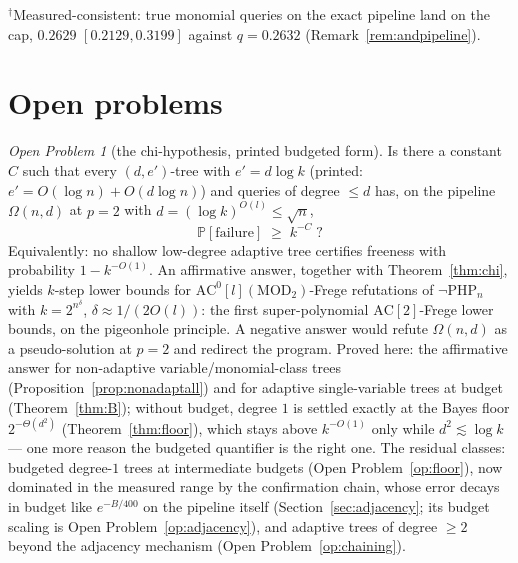 \documentclass[11pt]{article}
\theoremstyle{definition}
\theoremstyle{remark}
\newtheorem{openproblem}{Open Problem}
\newcommand{\PHPn}{\neg\mathrm{PHP}_n}
\newcommand{\Prob}{\mathbb{P}}
\newcommand{\AC}{\mathrm{AC}}
\begin{document}
\noindent$^{\dagger}$Measured-consistent: true monomial queries on the exact
pipeline land on the cap, $0.2629$ $[0.2129,0.3199]$ against
$q=0.2632$ (Remark~\ref{rem:andpipeline}).

\section{Open problems}\label{sec:open}

\begin{openproblem}[the chi-hypothesis, printed budgeted form]
\label{op:main}
Is there a constant $C$ such that every $(d,e')$-tree with
$e'=d\log k$ (printed: $e'=O(\log n)+O(d\log n)$) and queries of
degree $\le d$ has, on the pipeline
$\Omega(n,d)$ at $p=2$ with $d=(\log k)^{O(l)}\le\sqrt{n}$,
\[
\Prob[\text{failure}]\;\ge\;k^{-C}\;?
\]
Equivalently: no shallow low-degree adaptive tree certifies freeness
with probability $1-k^{-O(1)}$.  An affirmative answer, together with
Theorem~\ref{thm:chi}, yields $k$-step lower bounds for
$\AC^0[l](\mathrm{MOD}_2)$-Frege refutations of $\PHPn$ with
$k=2^{n^{\delta}}$, $\delta\approx1/(2O(l))$: the first
super-polynomial $\AC[2]$-Frege lower bounds, on the pigeonhole
principle.  A negative answer would refute $\Omega(n,d)$ as a
pseudo-solution at $p=2$ and redirect the program.  Proved here: the
affirmative answer for non-adaptive variable/monomial-class trees
(Proposition~\ref{prop:nonadaptall}) and for adaptive single-variable
trees at budget (Theorem~\ref{thm:B}); without budget, degree $1$ is
settled exactly at the Bayes floor $2^{-\Theta(d^2)}$
(Theorem~\ref{thm:floor}), which stays above $k^{-O(1)}$ only while
$d^2\lesssim\log k$ --- one more reason the budgeted quantifier is the
right one.  The residual classes: budgeted degree-$1$ trees at
intermediate budgets (Open Problem~\ref{op:floor}), now dominated in
the measured range by the confirmation chain, whose error decays in
budget like $e^{-B/400}$ on the pipeline itself
(Section~\ref{sec:adjacency}; its budget scaling is
Open Problem~\ref{op:adjacency}), and adaptive trees of degree $\ge2$
beyond the adjacency mechanism (Open Problem~\ref{op:chaining}).
\end{openproblem}
\end{document}
